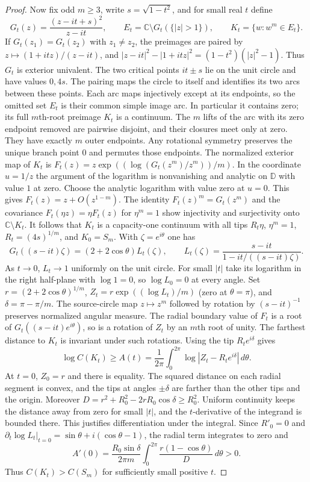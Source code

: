\documentclass[11pt]{article}
\newcommand{\D}{\mathbb D}
\newcommand{\C}{\mathbb C}
\begin{document}
\begin{proof}
		Now fix odd $m\geq3$, write $s=\sqrt{1-t^2}$, and for small real $t$
		define
		\[
		G_t(z)=\frac{(z-it+s)^2}{z-it},\qquad
		E_t=\C\setminus G_t(\{|z|>1\}),\qquad
		K_t=\{w:w^m\in E_t\}.
		\]
		If $G_t(z_1)=G_t(z_2)$ with $z_1\ne z_2$, the preimages are paired by
		$z\mapsto(1+itz)/(z-it)$, and
		$|z-it|^2-|1+itz|^2=(1-t^2)(|z|^2-1)$.
		Thus $G_t$ is exterior univalent.  The two critical points
		$it\pm s$ lie on the unit circle and have values $0,4s$.
		The pairing maps the circle to itself and identifies its two arcs
		between these points.  Each arc maps injectively except at its
		endpoints, so the omitted set $E_t$ is their common simple image arc.
		In particular it contains zero; its full $m$th-root preimage $K_t$
		is a continuum. The $m$ lifts of the arc with its zero endpoint
		removed are pairwise disjoint, and their closures meet only at zero.
		They have exactly $m$ outer endpoints. Any rotational symmetry
		preserves the unique branch point $0$ and permutes those endpoints.
		The normalized exterior map of $K_t$ is
		$F_t(z)=z\exp((\log(G_t(z^m)/z^m))/m)$. In the coordinate
		$u=1/z$ the argument of the logarithm is nonvanishing and analytic
		on $\D$ with value $1$ at zero. Choose the analytic logarithm with
		value zero at $u=0$. This gives $F_t(z)=z+O(z^{1-m})$. The identity $F_t(z)^m=G_t(z^m)$
		and the covariance $F_t(\eta z)=\eta F_t(z)$ for $\eta^m=1$
		show injectivity and surjectivity onto $\mathbb C\setminus K_t$.
		It follows that $K_t$ is a
		capacity-one continuum with all tips $R_t\eta$, $\eta^m=1$,
		$R_t=(4s)^{1/m}$, and $K_0=S_m$.
		With $\zeta=e^{i\theta}$ one has
		\[
		G_t((s-it)\zeta)=(2+2\cos\theta)L_t(\zeta),
		\qquad L_t(\zeta)=\frac{s-it}{1-it/((s-it)\zeta)}.
		\]
		As $t\to0$, $L_t\to1$ uniformly on the unit circle.
		For small $|t|$ take its logarithm in the right half-plane with
		$\log 1=0$, so $\log L_0=0$ at every angle.
		Set $r=(2+2\cos\theta)^{1/m}$,
		$Z_t=r\exp((\log L_t)/m)$ (zero at $\theta=\pi$), and
		$\delta=\pi-\pi/m$. The source-circle map $z\mapsto z^m$ followed
		by rotation by $(s-it)^{-1}$ preserves normalized angular measure.
		The radial boundary value of $F_t$ is a root of
		$G_t((s-it)e^{i\theta})$, so is a rotation of $Z_t$ by an $m$th
		root of unity. The farthest distance to $K_t$ is invariant under
		such rotations. Using the tip $R_te^{i\delta}$ gives
		\[
		\log C(K_t)\geq A(t)=\frac1{2\pi}\int_0^{2\pi}
		\log|Z_t-R_te^{i\delta}|\,d\theta.
		\]
		At $t=0$, $Z_0=r$ and there is equality. The squared distance on
		each radial segment is convex, and the tips at angles $\pm\delta$
		are farther than the other tips and the origin.
		Moreover $D=r^2+R_0^2-2rR_0\cos\delta\geq R_0^2$.
		Uniform continuity keeps the distance away from zero for small
		$|t|$, and the $t$-derivative of the integrand is bounded there.
		This justifies differentiation under the integral. Since $R'_0=0$ and
		$\partial_t\log L_t|_{t=0}=\sin\theta+i(\cos\theta-1)$,
		the radial term integrates to zero and
		\[
		A'(0)=\frac{R_0\sin\delta}{2\pi m}
		\int_0^{2\pi}\frac{r(1-\cos\theta)}{D}\,d\theta>0.
		\]
		Thus $C(K_t)>C(S_m)$ for sufficiently small positive $t$.
	\end{proof}
	
\end{document}
